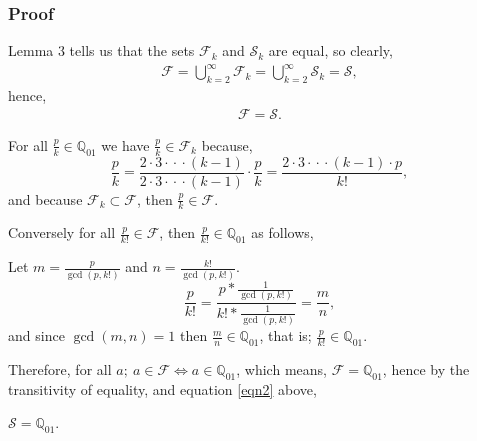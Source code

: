 \documentclass{article}
\begin{document}
\subsubsection*{Proof}

Lemma 3 tells us that the sets
\(\mathcal{F}_k\) and \(\mathcal{S}_k\) are equal, so clearly,
{\small
\begin{gather*}
\mathcal{F} = \bigcup\limits_{k=2}^{\infty} \mathcal{F}_k
= \bigcup\limits_{k=2}^{\infty} \mathcal{S}_k = \mathcal{S},
\end{gather*}
}
hence,
{\small
\begin{gather}
\mathcal{F} = \mathcal{S}. \label{eqn2}
\end{gather}
}

For all \(\frac{p}{k} \in \mathbb{Q}_{01}\) we have
\(\frac{p}{k} \in{} \mathcal{F}_k\) because,
{\small
\bgroup                                  %
\begin{equation*}
\frac{p}{k}
= \frac{2\cdot{}3\cdot{}\cdot{}\cdot{}(k-1)}{2\cdot{}3\cdot{}\cdot{}\cdot{}(k-1)} \cdot{} \frac{p}{k}
= \frac{2\cdot{}3\cdot{}\cdot{}\cdot{}(k-1)\cdot{}p}{k!},
\end{equation*}
\egroup
}
and because \(\mathcal{F}_k \subset \mathcal{F}\), then \(\frac{p}{k} \in \mathcal{F}\).

Conversely for all \(\frac{p}{k!} \in \mathcal{F}\), then \(\frac{p}{k!} \in \mathbb{Q}_{01}\) as follows,

Let \(m = \frac{p}{\gcd(p,k!)}\)
and \(n = \frac{k!}{\gcd(p,k!)}\).
{\small
\bgroup                                  %
\setlength{\abovedisplayskip}{0pt}       %
\begin{equation*}
\frac{p}{k!} = \frac{p*\frac{1}{\gcd(p,k!)}}{k!*\frac{1}{\gcd(p,k!)}} = \frac{m}{n},
\end{equation*}
\egroup
}\newline
and since \(\gcd(m,n) = 1\) then \(\frac{m}{n} \in \mathbb{Q}_{01}\), that is; \(\frac{p}{k!} \in \mathbb{Q}_{01}\).

Therefore, for all \(a;\ a \in \mathcal{F} \Leftrightarrow a \in \mathbb{Q}_{01}\), which means,
\(\mathcal{F} = \mathbb{Q}_{01}\),
hence by the transitivity of equality, and equation \eqref{eqn2} above,

\begin{center}
\(\mathcal{S} = \mathbb{Q}_{01}\).
\end{center}
\end{document}
